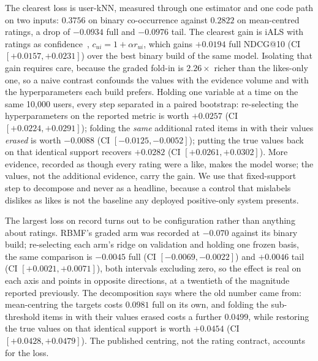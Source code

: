 \documentclass[acmsmall,review,anonymous]{acmart}
\begin{document}
The clearest loss is user-kNN, measured through one estimator and one code path on two inputs: $0.3756$ on binary co-occurrence against $0.2822$ on mean-centred ratings, a drop of $-0.0934$ full and $-0.0976$ tail. The clearest gain is iALS with ratings as confidence~\citep{hu2008collaborative}, $c_{ui}=1+\alpha r_{ui}$, which gains $+0.0194$ full NDCG@10 (CI $[+0.0157,+0.0231]$) over the best binary build of the same model. Isolating that gain requires care, because the graded fold-in is $2.26\times$ richer than the likes-only one, so a naive contrast confounds the values with the evidence volume and with the hyperparameters each build prefers. Holding one variable at a time on the same 10,000 users, every step separated in a paired bootstrap: re-selecting the hyperparameters on the reported metric is worth $+0.0257$ (CI $[+0.0224,+0.0291]$); folding the \emph{same} additional rated items in with their values \emph{erased} is worth $-0.0088$ (CI $[-0.0125,-0.0052]$); putting the true values back on that identical support recovers $+0.0282$ (CI $[+0.0261,+0.0302]$). More evidence, recorded as though every rating were a like, makes the model worse; the values, not the additional evidence, carry the gain. We use that fixed-support step to decompose and never as a headline, because a control that mislabels dislikes as likes is not the baseline any deployed positive-only system presents.

The largest loss on record turns out to be configuration rather than anything about ratings. RBMF's graded arm was recorded at $-0.070$ against its binary build; re-selecting each arm's ridge on validation and holding one frozen basis, the same comparison is $-0.0045$ full (CI $[-0.0069,-0.0022]$) and $+0.0046$ tail (CI $[+0.0021,+0.0071]$), both intervals excluding zero, so the effect is real on each axis and points in opposite directions, at a twentieth of the magnitude reported previously. The decomposition says where the old number came from: mean-centring the targets costs $0.0981$ full on its own, and folding the sub-threshold items in with their values erased costs a further $0.0499$, while restoring the true values on that identical support is worth $+0.0454$ (CI $[+0.0428,+0.0479]$). The published centring, not the rating contract, accounts for the loss.
\end{document}
